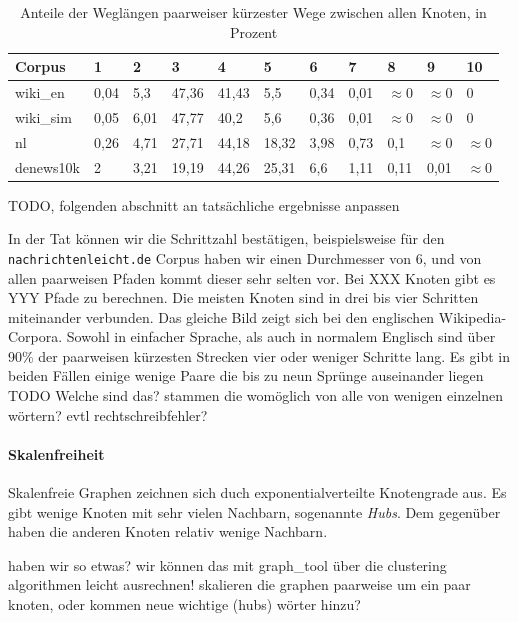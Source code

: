 \documentclass[12pt, a4paper]{article}
\begin{document}
\begin{table}[h]
  \begin{tabular}{l|llllllllll}
    Corpus      & 1      & 2      & 3       & 4       & 5       & 6      & 7      & 8             & 9             & 10           \\
\hline
    wiki\_en    & 0,04 & 5,3  & 47,36 & 41,43 & 5,5   & 0,34 & 0,01 & $\approx$0  & $\approx$0  & 0          \\
    wiki\_sim   & 0,05 & 6,01 & 47,77 & 40,2  & 5,6   & 0,36 & 0,01 & $\approx$0  & $\approx$0  & 0          \\
    nl          & 0,26 & 4,71 & 27,71 & 44,18 & 18,32 & 3,98 & 0,73 & 0,1         & $\approx$0  & $\approx$0 \\
    denews10k   & 2    & 3,21 & 19,19 & 44,26 & 25,31 & 6,6  & 1,11 & 0,11        & 0,01        & $\approx$0 \\
  \end{tabular}
  \caption{Anteile der Weglängen paarweiser kürzester Wege zwischen allen Knoten, in Prozent}
\end{table}

TODO, folgenden abschnitt an tatsächliche ergebnisse anpassen 

In der Tat können wir die Schrittzahl bestätigen, beispielsweise für den
\texttt{nachrichtenleicht.de} Corpus haben wir einen Durchmesser von 6, und von
allen paarweisen Pfaden kommt dieser sehr selten vor. Bei XXX Knoten gibt
es YYY Pfade zu berechnen. Die meisten Knoten sind in drei bis vier Schritten
miteinander verbunden.
Das gleiche Bild zeigt sich bei den englischen Wikipedia-Corpora. Sowohl in 
einfacher Sprache, als auch in normalem Englisch sind über 90\% der paarweisen
kürzesten Strecken vier oder weniger Schritte lang. Es gibt in beiden Fällen 
einige wenige Paare die bis zu neun Sprünge auseinander liegen
TODO Welche sind das? stammen die womöglich von alle von wenigen einzelnen wörtern? evtl rechtschreibfehler? 

                             
\paragraph{Skalenfreiheit}
Skalenfreie Graphen zeichnen sich duch exponentialverteilte Knotengrade aus. Es gibt wenige Knoten mit sehr vielen Nachbarn, sogenannte \emph{Hubs}. Dem gegenüber haben die anderen Knoten relativ wenige Nachbarn. 

haben wir so etwas? wir können das mit graph\_tool über die
clustering algorithmen leicht ausrechnen!  skalieren die graphen paarweise um
ein paar knoten, oder kommen neue wichtige (hubs) wörter hinzu?
\end{document}

